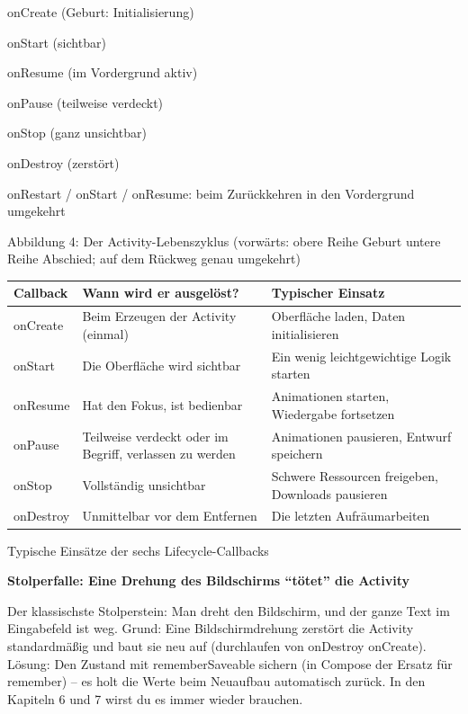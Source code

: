 onCreate (Geburt: Initialisierung)

onStart (sichtbar)

onResume (im Vordergrund aktiv)

onPause (teilweise verdeckt)

onStop (ganz unsichtbar)

onDestroy (zerstört)

onRestart / onStart / onResume: beim Zurückkehren in den Vordergrund umgekehrt

\begin{center}\small\color{gray}Abbildung 4: Der Activity-Lebenszyklus (vorwärts: obere Reihe Geburt untere Reihe Abschied; auf dem Rückweg genau umgekehrt)\end{center}

\begin{center}
\begin{tabularx}{\linewidth}{|X|X|X|}
\hline
\textbf{Callback} & \textbf{Wann wird er ausgelöst?} & \textbf{Typischer Einsatz} \tabularnewline
\hline
onCreate & Beim Erzeugen der Activity (einmal) & Oberfläche laden, Daten initialisieren \tabularnewline
onStart & Die Oberfläche wird sichtbar & Ein wenig leichtgewichtige Logik starten \tabularnewline
onResume & Hat den Fokus, ist bedienbar & Animationen starten, Wiedergabe fortsetzen \tabularnewline
onPause & Teilweise verdeckt oder im Begriff, verlassen zu werden & Animationen pausieren, Entwurf speichern \tabularnewline
onStop & Vollständig unsichtbar & Schwere Ressourcen freigeben, Downloads pausieren \tabularnewline
onDestroy & Unmittelbar vor dem Entfernen & Die letzten Aufräumarbeiten \tabularnewline
\hline
\end{tabularx}
\end{center}

\begin{center}\small\color{gray}Typische Einsätze der sechs Lifecycle-Callbacks\end{center}

\textbf{Stolperfalle: Eine Drehung des Bildschirms “tötet” die Activity}\par

Der klassischste Stolperstein: Man dreht den Bildschirm, und der ganze Text im Eingabefeld ist weg. Grund: Eine Bildschirmdrehung zerstört die Activity standardmäßig und baut sie neu auf (durchlaufen von onDestroy onCreate). Lösung: Den Zustand mit rememberSaveable sichern (in Compose der Ersatz für remember) – es holt die Werte beim Neuaufbau automatisch zurück. In den Kapiteln 6 und 7 wirst du es immer wieder brauchen.

